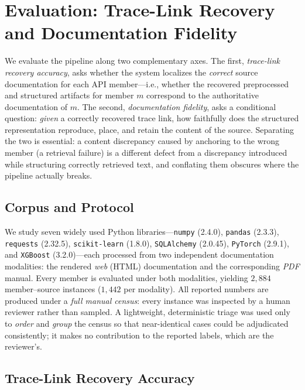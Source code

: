 \section{Evaluation: Trace-Link Recovery and Documentation Fidelity}
\label{sec:eval}

We evaluate the pipeline along two complementary axes. The first,
\emph{trace-link recovery accuracy}, asks whether the system localizes the
\emph{correct} source documentation for each API member---i.e., whether the
recovered preprocessed and structured artifacts for member $m$ correspond to the
authoritative documentation of $m$. The second, \emph{documentation fidelity},
asks a conditional question: \emph{given} a correctly recovered trace link, how
faithfully does the structured representation reproduce, place, and retain the
content of the source. Separating the two is essential: a content discrepancy
caused by anchoring to the wrong member (a retrieval failure) is a different
defect from a discrepancy introduced while structuring correctly retrieved text,
and conflating them obscures where the pipeline actually breaks.

\subsection{Corpus and Protocol}
\label{sec:eval-corpus}

We study seven widely used Python libraries---\texttt{numpy} (2.4.0),
\texttt{pandas} (2.3.3), \texttt{requests} (2.32.5), \texttt{scikit-learn}
(1.8.0), \texttt{SQLAlchemy} (2.0.45), \texttt{PyTorch} (2.9.1), and
\texttt{XGBoost} (3.2.0)---each processed from two independent documentation
modalities: the rendered \emph{web} (HTML) documentation and the corresponding
\emph{PDF} manual. Every member is evaluated under both modalities, yielding
$2{,}884$ member--source instances ($1{,}442$ per modality). All reported
numbers are produced under a \emph{full manual census}: every instance was
inspected by a human reviewer rather than sampled. A lightweight, deterministic
triage was used only to \emph{order} and \emph{group} the census so that
near-identical cases could be adjudicated consistently; it makes no contribution
to the reported labels, which are the reviewer's.

\subsection{Trace-Link Recovery Accuracy}
\label{sec:eval-trace}

